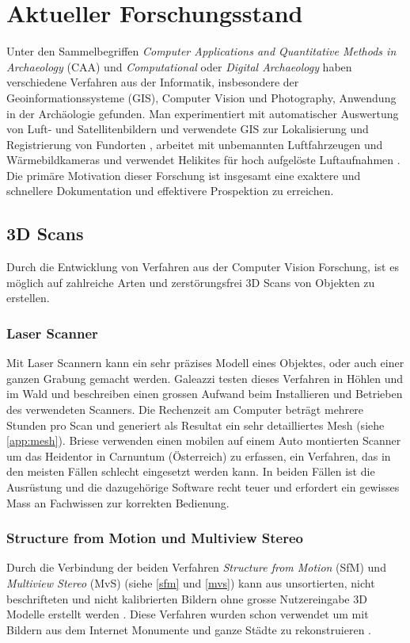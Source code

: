\chapter{Aktueller Forschungsstand}

	Unter den Sammelbegriffen \emph{Computer Applications and Quantitative Methods in Archaeology} (CAA) und \emph{Computational} oder \emph{Digital Archaeology} haben verschiedene Verfahren aus der Informatik, insbesondere der Geoinformationssysteme (GIS), Computer Vision und Photography, Anwendung in der Archäologie gefunden.
	Man experimentiert mit automatischer Auswertung von Luft- und Satellitenbildern und verwendete GIS zur Lokalisierung und Registrierung von Fundorten \cite{comp_app_arch}, arbeitet mit unbemannten Luftfahrzeugen und Wärmebildkameras \cite{Casana2014207} und verwendet Helikites für hoch aufgelöste Luftaufnahmen \cite{ARCM:ARCM667}.
	Die primäre Motivation dieser Forschung ist insgesamt eine exaktere und schnellere Dokumentation und effektivere Prospektion zu erreichen.

	\section{3D Scans}
		Durch die Entwicklung von Verfahren aus der Computer Vision Forschung, ist es möglich auf zahlreiche Arten und zerstörungsfrei 3D Scans von Objekten zu erstellen.
		\subsection{Laser Scanner}
			Mit Laser Scannern kann ein sehr präzises Modell eines Objektes, oder auch einer ganzen Grabung gemacht werden. Galeazzi  \etal \cite{arch:laser_vs_dense_stereo} testen dieses Verfahren in Höhlen und im Wald und beschreiben einen grossen Aufwand beim Installieren und Betrieben des verwendeten Scanners. Die Rechenzeit am Computer beträgt mehrere Stunden pro Scan und generiert als Resultat ein sehr detailliertes Mesh (siehe \autoref{app:mesh}).
			Briese \etal \cite{TUW-210216} verwenden einen mobilen auf einem Auto montierten Scanner um das Heidentor in Carnuntum (Österreich) zu erfassen, ein Verfahren, das in den meisten Fällen schlecht eingesetzt werden kann.
			In beiden Fällen ist die Ausrüstung und die dazugehörige Software recht teuer und erfordert ein gewisses Mass an Fachwissen zur korrekten Bedienung.

		\subsection{Structure from Motion und Multiview Stereo}
			Durch die Verbindung der beiden Verfahren \emph{Structure from Motion} (SfM) und \emph{Multiview Stereo} (MvS) (siehe \autoref{sfm} und \autoref{mvs}) kann aus unsortierten, nicht beschrifteten und nicht kalibrierten Bildern ohne grosse Nutzereingabe 3D Modelle erstellt werden \cite{Szeliski:2010:CVA:1941882, Agarwal:2011:BRD:2001269.2001293, Furu:2010:PMVS}. Diese Verfahren wurden schon verwendet um mit Bildern aus dem Internet Monumente und ganze Städte zu rekonstruieren \cite{Agarwal:2011:BRD:2001269.2001293, Furu:2010, Frahm_buildingrome, Snavely:2006:PTE:1179352.1141964}.
		
